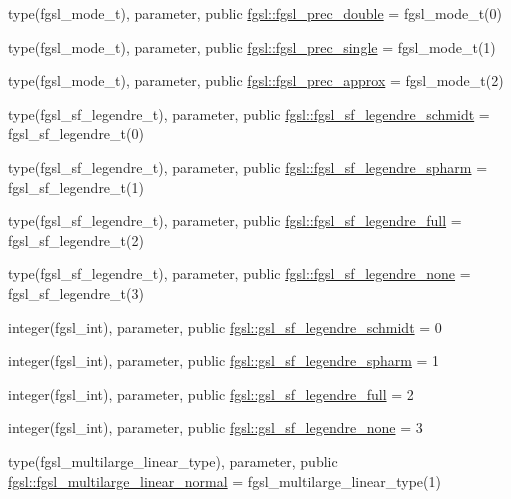 \begin{DoxyCompactItemize}
\item 
type(fgsl\+\_\+mode\+\_\+t), parameter, public \hyperlink{namespacefgsl_a974fb113c1c5dced8257e1eae0def683}{fgsl\+::fgsl\+\_\+prec\+\_\+double} = fgsl\+\_\+mode\+\_\+t(0)
\item 
type(fgsl\+\_\+mode\+\_\+t), parameter, public \hyperlink{namespacefgsl_ac6801c472f4316aa060668c157db61bd}{fgsl\+::fgsl\+\_\+prec\+\_\+single} = fgsl\+\_\+mode\+\_\+t(1)
\item 
type(fgsl\+\_\+mode\+\_\+t), parameter, public \hyperlink{namespacefgsl_ab6d5bd94526f9dacea9ce2293a66c824}{fgsl\+::fgsl\+\_\+prec\+\_\+approx} = fgsl\+\_\+mode\+\_\+t(2)
\item 
type(fgsl\+\_\+sf\+\_\+legendre\+\_\+t), parameter, public \hyperlink{namespacefgsl_a8b170e3b737833743129ce02b48f23a9}{fgsl\+::fgsl\+\_\+sf\+\_\+legendre\+\_\+schmidt} = fgsl\+\_\+sf\+\_\+legendre\+\_\+t(0)
\item 
type(fgsl\+\_\+sf\+\_\+legendre\+\_\+t), parameter, public \hyperlink{namespacefgsl_a13c5fa76fa6a114bff70b0d830517e5c}{fgsl\+::fgsl\+\_\+sf\+\_\+legendre\+\_\+spharm} = fgsl\+\_\+sf\+\_\+legendre\+\_\+t(1)
\item 
type(fgsl\+\_\+sf\+\_\+legendre\+\_\+t), parameter, public \hyperlink{namespacefgsl_a8a929fa82ff6c96e5022ee2346fb2732}{fgsl\+::fgsl\+\_\+sf\+\_\+legendre\+\_\+full} = fgsl\+\_\+sf\+\_\+legendre\+\_\+t(2)
\item 
type(fgsl\+\_\+sf\+\_\+legendre\+\_\+t), parameter, public \hyperlink{namespacefgsl_ab780f015ad3062497e33c2629f13e021}{fgsl\+::fgsl\+\_\+sf\+\_\+legendre\+\_\+none} = fgsl\+\_\+sf\+\_\+legendre\+\_\+t(3)
\item 
integer(fgsl\+\_\+int), parameter, public \hyperlink{namespacefgsl_a2621c92cbb7a2c08eaaaa7f9cd3a32ff}{fgsl\+::gsl\+\_\+sf\+\_\+legendre\+\_\+schmidt} = 0
\item 
integer(fgsl\+\_\+int), parameter, public \hyperlink{namespacefgsl_a16ccc1e4e6aa459e435bad49a3c88e62}{fgsl\+::gsl\+\_\+sf\+\_\+legendre\+\_\+spharm} = 1
\item 
integer(fgsl\+\_\+int), parameter, public \hyperlink{namespacefgsl_a635161b3c6f02e2821807e5acb512573}{fgsl\+::gsl\+\_\+sf\+\_\+legendre\+\_\+full} = 2
\item 
integer(fgsl\+\_\+int), parameter, public \hyperlink{namespacefgsl_a09eadb78c5f3fc4662d23ac52aaa33b3}{fgsl\+::gsl\+\_\+sf\+\_\+legendre\+\_\+none} = 3
\item 
type(fgsl\+\_\+multilarge\+\_\+linear\+\_\+type), parameter, public \hyperlink{namespacefgsl_ae183ddeba0c0b5b8bc4ca6508e63519b}{fgsl\+::fgsl\+\_\+multilarge\+\_\+linear\+\_\+normal} = fgsl\+\_\+multilarge\+\_\+linear\+\_\+type(1)

\end{DoxyCompactItemize}

